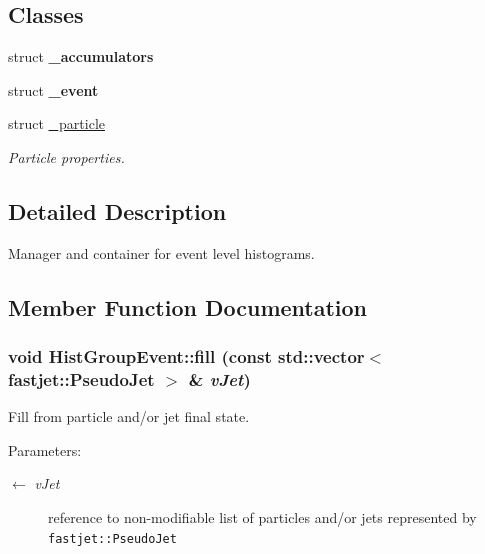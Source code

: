 \subsection*{Classes}
\begin{CompactItemize}
\item 
struct \textbf{\_\-accumulators}
\item 
struct \textbf{\_\-event}
\item 
struct \hyperlink{structHistGroupEvent_1_1__particle}{\_\-particle}
\begin{CompactList}\small\item\em Particle properties. \item\end{CompactList}\end{CompactItemize}


\subsection{Detailed Description}
Manager and container for event level histograms. 



\subsection{Member Function Documentation}
\hypertarget{classHistGroupEvent_7cdf3dd95af609b72fa981a389a21070}{
\subsubsection[fill]{\setlength{\rightskip}{0pt plus 5cm}void Hist\-Group\-Event::fill (const std::vector$<$ fastjet::Pseudo\-Jet $>$ \& {\em v\-Jet})}}
\label{classHistGroupEvent_7cdf3dd95af609b72fa981a389a21070}


Fill from particle and/or jet final state. 

\begin{Desc}
\item[Parameters:]
\begin{description}
\item[\mbox{$\leftarrow$} {\em v\-Jet}]reference to non-modifiable list of particles and/or jets represented by {\tt fastjet::Pseudo\-Jet} \end{description}
\end{Desc}


